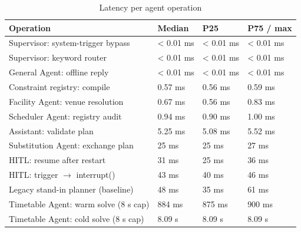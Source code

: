 \begin{table}[t]
\centering
\small
\begin{tabular}{llll}
\toprule
Operation & Median & P25 & P75 / max \\
\midrule
Supervisor: system-trigger bypass & < 0.01 ms & < 0.01 ms & < 0.01 ms \\
Supervisor: keyword router & < 0.01 ms & < 0.01 ms & < 0.01 ms \\
General Agent: offline reply & < 0.01 ms & < 0.01 ms & < 0.01 ms \\
Constraint registry: compile & 0.57 ms & 0.56 ms & 0.59 ms \\
Facility Agent: venue resolution & 0.67 ms & 0.56 ms & 0.83 ms \\
Scheduler Agent: registry audit & 0.94 ms & 0.90 ms & 1.00 ms \\
Assistant: validate plan & 5.25 ms & 5.08 ms & 5.52 ms \\
Substitution Agent: exchange plan & 25 ms & 25 ms & 27 ms \\
HITL: resume after restart & 31 ms & 25 ms & 36 ms \\
HITL: trigger $\rightarrow$ interrupt() & 43 ms & 40 ms & 46 ms \\
Legacy stand-in planner (baseline) & 48 ms & 35 ms & 61 ms \\
Timetable Agent: warm solve (8 s cap) & 884 ms & 875 ms & 900 ms \\
Timetable Agent: cold solve (8 s cap) & 8.09 s & 8.09 s & 8.09 s \\
\bottomrule
\end{tabular}
\caption{Latency per agent operation}
\label{tab:t3-latency}
\end{table}
